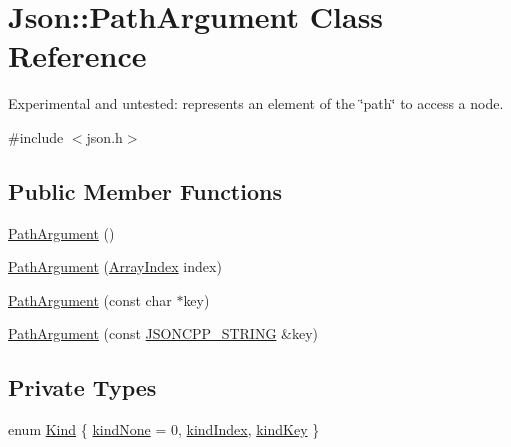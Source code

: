 \hypertarget{classJson_1_1PathArgument}{}\section{Json\+:\+:Path\+Argument Class Reference}
\label{classJson_1_1PathArgument}


Experimental and untested\+: represents an element of the \char`\"{}path\char`\"{} to access a node.  




{\ttfamily \#include $<$json.\+h$>$}

\subsection*{Public Member Functions}
\begin{DoxyCompactItemize}
\item 
\hyperlink{classJson_1_1PathArgument_a3c96ed20c56a55eb76d37a11553c528e_a3c96ed20c56a55eb76d37a11553c528e}{Path\+Argument} ()
\item 
\hyperlink{classJson_1_1PathArgument_a53c5b27143b161301b95fd544c139ecf_a53c5b27143b161301b95fd544c139ecf}{Path\+Argument} (\hyperlink{namespaceJson_a8048e741f2177c3b5d9ede4a5b8c53c2_a8048e741f2177c3b5d9ede4a5b8c53c2}{Array\+Index} index)
\item 
\hyperlink{classJson_1_1PathArgument_a9690417a8a40e6e49f2acdf6c9281345_a9690417a8a40e6e49f2acdf6c9281345}{Path\+Argument} (const char $\ast$key)
\item 
\hyperlink{classJson_1_1PathArgument_ac15f25452124fbf21218897113015301_ac15f25452124fbf21218897113015301}{Path\+Argument} (const \hyperlink{json_8h_a1e723f95759de062585bc4a8fd3fa4be_a1e723f95759de062585bc4a8fd3fa4be}{J\+S\+O\+N\+C\+P\+P\+\_\+\+S\+T\+R\+I\+NG} \&key)
\end{DoxyCompactItemize}
\subsection*{Private Types}
\begin{DoxyCompactItemize}
\item 
enum \hyperlink{classJson_1_1PathArgument_a2420bbad778573c147e578701b84d9b9_a2420bbad778573c147e578701b84d9b9}{Kind} \{ \hyperlink{classJson_1_1PathArgument_a2420bbad778573c147e578701b84d9b9_a2420bbad778573c147e578701b84d9b9afa8c7a261ccb8ae5171d2372321c2698}{kind\+None} = 0, 
\hyperlink{classJson_1_1PathArgument_a2420bbad778573c147e578701b84d9b9_a2420bbad778573c147e578701b84d9b9ae5a976b898111903334cb131f5e03dc4}{kind\+Index}, 
\hyperlink{classJson_1_1PathArgument_a2420bbad778573c147e578701b84d9b9_a2420bbad778573c147e578701b84d9b9a74f5968d06c01701b7a46092c33ba7d1}{kind\+Key}
 \}
\end{DoxyCompactItemize}
